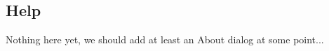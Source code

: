 \subsection{Help}

Nothing here yet, we should add at least an About dialog at some point...


\begin{comment}
\section{Toolbar}

The toolbar contains buttons and controls for the most frequently used actions.

\begin{figure}[h]
\centering
\texttt{[image: images/toolbar.png]}
\caption{ngscopeclient toolbar}
\label{toolbar}
\end{figure}

\subsection{Capture buttons}

The capture button group (Fig. \ref{capturebuttons}) contains three buttons. From left to right these are ``arm
normal trigger", ``arm one-shot trigger" and ``stop trigger".

Note that the ``normal" trigger mode still uses one-shot capture internally so that all waveform data can be downloaded
before the next trigger event.

\begin{figure}[h]
\centering
\texttt{[image: images/capture-icons.png]}
\caption{Capture control buttons}
\label{capturebuttons}
\end{figure}

\subsection{History}

The history button (Fig. \ref{historybutton}) toggles display of the \hyperref[sec:history]{waveform history view}.

\begin{figure}[h]
\centering
\texttt{[image: images/history-button.png]}
\caption{History button}
\label{historybutton}
\end{figure}


\end{comment}
